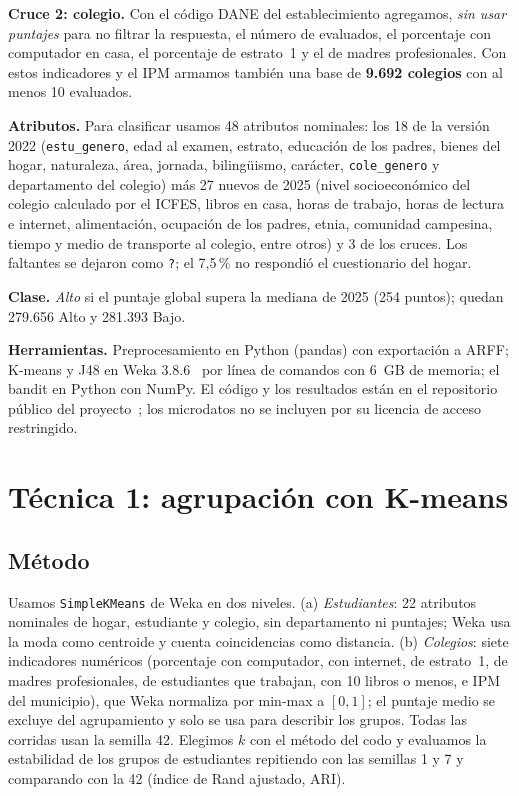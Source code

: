 \documentclass[conference]{IEEEtran}
\begin{document}
\textbf{Cruce 2: colegio.} Con el código DANE del establecimiento agregamos, \emph{sin usar puntajes} para no filtrar la respuesta, el número de evaluados, el porcentaje con computador en casa, el porcentaje de estrato~1 y el de madres profesionales. Con estos indicadores y el IPM armamos también una base de \textbf{9.692 colegios} con al menos 10 evaluados.

\textbf{Atributos.} Para clasificar usamos 48 atributos nominales: los 18 de la versión 2022 (\texttt{estu\_genero}, edad al examen, estrato, educación de los padres, bienes del hogar, naturaleza, área, jornada, bilingüismo, carácter, \texttt{cole\_genero} y departamento del colegio) más 27 nuevos de 2025 (nivel socioeconómico del colegio calculado por el ICFES, libros en casa, horas de trabajo, horas de lectura e internet, alimentación, ocupación de los padres, etnia, comunidad campesina, tiempo y medio de transporte al colegio, entre otros) y 3 de los cruces. Los faltantes se dejaron como \texttt{?}; el 7,5\,\% no respondió el cuestionario del hogar.

\textbf{Clase.} \emph{Alto} si el puntaje global supera la mediana de 2025 (254 puntos); quedan 279.656 Alto y 281.393 Bajo.

\textbf{Herramientas.} Preprocesamiento en Python (pandas) con exportación a ARFF; K-means y J48 en Weka 3.8.6~\cite{weka} por línea de comandos con 6~GB de memoria; el bandit en Python con NumPy. El código y los resultados están en el repositorio público del proyecto~\cite{repo}; los microdatos no se incluyen por su licencia de acceso restringido.

\section{Técnica 1: agrupación con K-means}
\subsection{Método}
Usamos \texttt{SimpleKMeans} de Weka en dos niveles. (a) \emph{Estudiantes}: 22 atributos nominales de hogar, estudiante y colegio, sin departamento ni puntajes; Weka usa la moda como centroide y cuenta coincidencias como distancia. (b) \emph{Colegios}: siete indicadores numéricos (porcentaje con computador, con internet, de estrato~1, de madres profesionales, de estudiantes que trabajan, con 10 libros o menos, e IPM del municipio), que Weka normaliza por min-max a $[0,1]$; el puntaje medio se excluye del agrupamiento y solo se usa para describir los grupos. Todas las corridas usan la semilla 42. Elegimos $k$ con el método del codo y evaluamos la estabilidad de los grupos de estudiantes repitiendo con las semillas 1 y 7 y comparando con la 42 (índice de Rand ajustado, ARI).
\end{document}
